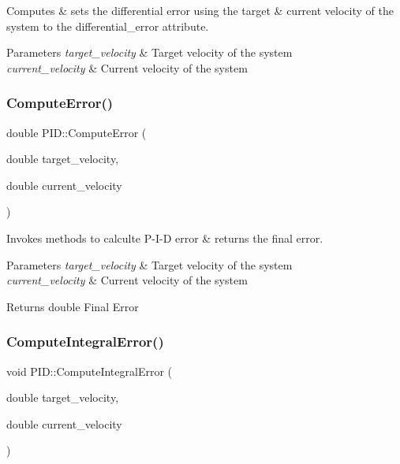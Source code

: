 Computes \& sets the differential error using the target \& current velocity of the system to the differential\+\_\+error attribute. 


\begin{DoxyParams}{Parameters}
{\em target\+\_\+velocity} & Target velocity of the system \\
\hline
{\em current\+\_\+velocity} & Current velocity of the system \\
\hline
\end{DoxyParams}
\mbox{\label{classPID_ad5113ca1c4111c36945646a2f23f6a3a}} 
\subsubsection{\texorpdfstring{Compute\+Error()}{ComputeError()}}
{\footnotesize\ttfamily double P\+I\+D\+::\+Compute\+Error (\begin{DoxyParamCaption}\item[{double}]{target\+\_\+velocity,  }\item[{double}]{current\+\_\+velocity }\end{DoxyParamCaption})}



Invokes methods to calculte P-\/\+I-\/D error \& returns the final error. 


\begin{DoxyParams}{Parameters}
{\em target\+\_\+velocity} & Target velocity of the system \\
\hline
{\em current\+\_\+velocity} & Current velocity of the system \\
\hline
\end{DoxyParams}
\begin{DoxyReturn}{Returns}
double Final Error 
\end{DoxyReturn}
\mbox{\label{classPID_a4af936207ba4f04163709e4bfd909468}} 
\subsubsection{\texorpdfstring{Compute\+Integral\+Error()}{ComputeIntegralError()}}
{\footnotesize\ttfamily void P\+I\+D\+::\+Compute\+Integral\+Error (\begin{DoxyParamCaption}\item[{double}]{target\+\_\+velocity,  }\item[{double}]{current\+\_\+velocity }\end{DoxyParamCaption})\hspace{0.3cm}{\ttfamily [private]}}



